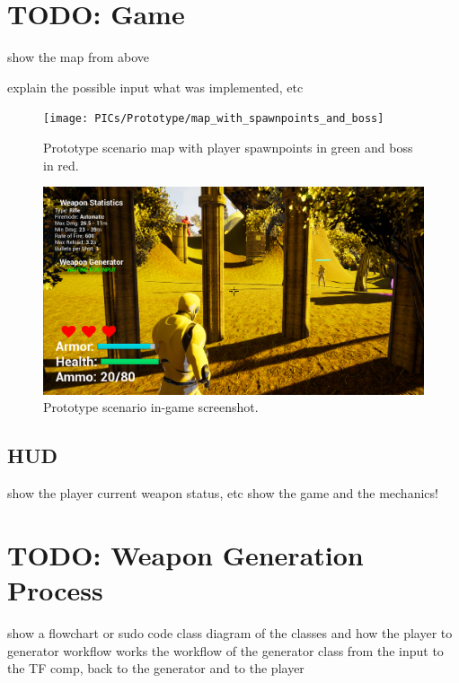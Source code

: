 \documentclass[MGS,Master,english]{twbook}%
\begin{document}
\section{TODO: Game}
show the map from above

explain the possible input
what was implemented, etc
\begin{figure}[!htbp]
	\centering
	\texttt{[image: PICs/Prototype/map\_with\_spawnpoints\_and\_boss]}
	\caption{Prototype scenario map with player spawnpoints in green and boss in red.}
\end{figure}
\begin{figure}[!htbp]
	\centering
	\includegraphics[width=1.0\linewidth]{PICs/Prototype/ingame_screenshot}
	\caption{Prototype scenario in-game screenshot.}
\end{figure}


\subsection{HUD}
show the player current weapon status, etc
show the game and the mechanics!

\section{TODO: Weapon Generation Process}
show a flowchart or sudo code
class diagram of the classes and how the player to generator workflow works
the workflow of the generator class from the input to the TF comp, back to the generator and to the player
\end{document}
